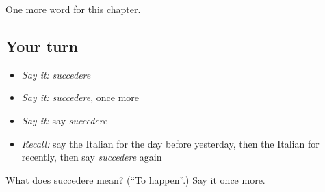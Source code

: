 \begin{grammarlens}[title={What you've built}]
One more word for this chapter.
\end{grammarlens}

\subsection*{Your turn}
\begin{itemize}
\raggedright
  \item \emph{Say it:} \emph{succedere}
  \item \emph{Say it:} \emph{succedere}, once more
  \item \emph{Say it:} say \emph{succedere}
  \item \emph{Recall:} say the Italian for the day before yesterday, then the Italian for recently, then say \emph{succedere} again
\end{itemize}

\begin{tcolorbox}[breakable,colback=teal!4,colframe=teal!35!black,title={Before you move on}]
What does succedere mean? (\textquotedblleft{}To happen\textquotedblright{}.) Say it once more.
\end{tcolorbox}
